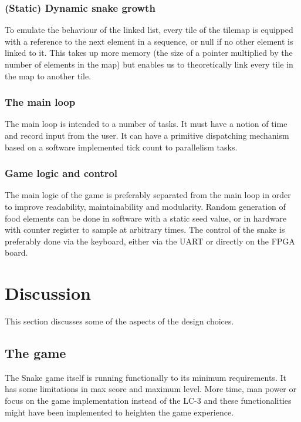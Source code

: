 \documentclass{acm_proc_article-sp}
\begin{document}
\subsubsection{(Static) Dynamic snake growth}
To emulate the behaviour of the linked list, every tile of the tilemap is equipped with a reference to the next element in a sequence, or null if no other element is linked to it. This takes up more memory (the size of a pointer multiplied by the number of elements in the map) but enables us to theoretically link every tile in the map to another tile.

\subsubsection{The main loop}
The main loop is intended to a number of tasks. It must have a notion of time and record input from the user. It can have a primitive dispatching mechanism based on a software implemented tick count to parallelism tasks.

\subsubsection{Game logic and control}
The main logic of the game is preferably separated from the main loop in order to improve readability, maintainability and modularity. Random generation of food elements can be done in software with a static seed value, or in hardware with counter register to sample at arbitrary times.
The control of the snake is preferably done via the keyboard, either via the UART or directly on the FPGA board.


\section{Discussion}
This section discusses some of the aspects of the design choices.

\subsection{The game}
The Snake game itself is running functionally to its minimum requirements. 
It has some limitations in max score and maximum level.
More time, man power or focus on the game implementation instead of the LC-3 and these functionalities might have been implemented to heighten the game experience.
\end{document}
